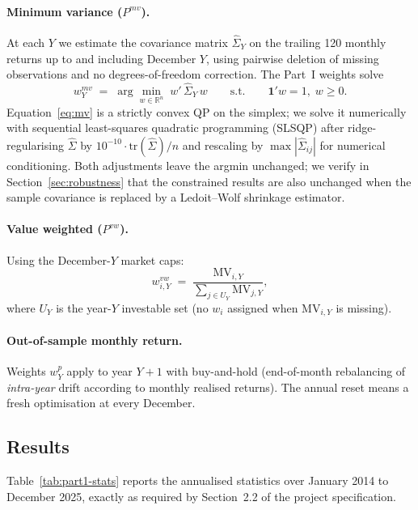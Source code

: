 \documentclass[11pt,a4paper]{article}
\begin{document}
\paragraph{Minimum variance ($P^{mv}$).} At each $Y$ we estimate the
covariance matrix $\widehat\Sigma_Y$ on the trailing 120 monthly returns up
to and including December $Y$, using pairwise deletion of missing
observations and no degrees-of-freedom correction. The Part~I weights
solve
\begin{equation}\label{eq:mv}
  w^{mv}_Y \;=\; \arg\min_{w \in \mathbb{R}^n}\; w'\,\widehat\Sigma_Y\,w
  \qquad \text{s.t.}\qquad \mathbf{1}'w = 1,\; w \ge 0.
\end{equation}
Equation~\eqref{eq:mv} is a strictly convex QP on the simplex; we solve
it numerically with sequential least-squares quadratic programming
(SLSQP) after ridge-regularising $\widehat\Sigma$ by
$10^{-10}\cdot \text{tr}(\widehat\Sigma)/n$ and rescaling by
$\max|\widehat\Sigma_{ij}|$ for numerical conditioning. Both adjustments
leave the argmin unchanged; we verify in
Section~\ref{sec:robustness} that the constrained results are also
unchanged when the sample covariance is replaced by a Ledoit--Wolf
shrinkage estimator.

\paragraph{Value weighted ($P^{vw}$).} Using the December-$Y$ market caps:
\begin{equation}\label{eq:vw}
  w^{vw}_{i,Y} \;=\; \frac{\text{MV}_{i,Y}}{\sum_{j\in U_Y}\text{MV}_{j,Y}},
\end{equation}
where $U_Y$ is the year-$Y$ investable set (no $w_i$ assigned when
$\text{MV}_{i,Y}$ is missing).

\paragraph{Out-of-sample monthly return.} Weights $w^{p}_Y$ apply to year
$Y+1$ with buy-and-hold (end-of-month rebalancing of \emph{intra-year} drift
according to monthly realised returns). The annual reset means a fresh
optimisation at every December.

\subsection{Results}

Table~\ref{tab:part1-stats} reports the annualised statistics over
January 2014 to December 2025, exactly as required by Section~2.2 of the
project specification.
\end{document}
